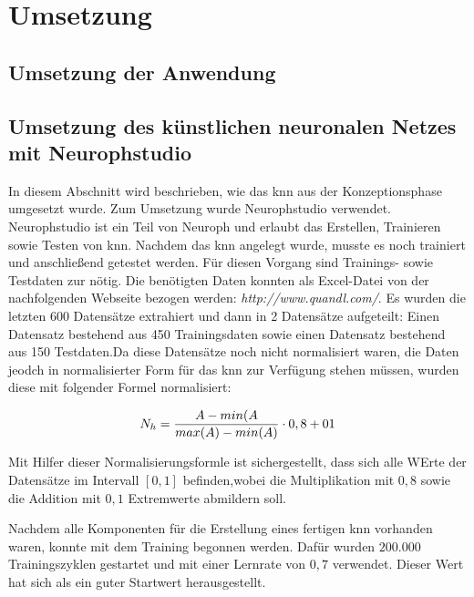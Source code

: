 \chapter{Umsetzung} %

\section{Umsetzung der Anwendung} %

\section{Umsetzung des künstlichen neuronalen Netzes mit Neurophstudio} %
\label{section:Umsetzung des künstlichen neuronalen Netzes mit Neurophstudio} %

In diesem Abschnitt wird beschrieben, wie das \acs{knn} aus der Konzeptionsphase umgesetzt wurde. Zum Umsetzung wurde Neurophstudio verwendet. Neurophstudio ist ein Teil von Neuroph und erlaubt das Erstellen, Trainieren sowie Testen von \acs{knn}.
Nachdem das \acs{knn} angelegt wurde, musste es noch trainiert und anschließend getestet werden. Für diesen Vorgang sind Trainings- sowie Testdaten zur nötig. Die benötigten Daten konnten als Excel-Datei von der nachfolgenden Webseite bezogen werden: 
\textit{http://www.quandl.com/}. Es wurden die letzten 600 Datensätze extrahiert und dann in 2 Datensätze aufgeteilt: Einen Datensatz bestehend aus 450 Trainingsdaten sowie einen Datensatz bestehend aus 150 Testdaten.Da diese Datensätze noch nicht normalisiert waren, die Daten jeodch in normalisierter Form für das \acs{knn} zur Verfügung stehen müssen, wurden diese mit folgender Formel normalisiert:

\begin{equation}\formelentry{Normalisierungsformel}
  N_h = \frac{A-min(A}{max(A)-min(A)}\cdot0,8+01
\end{equation}

Mit Hilfer dieser Normalisierungsformle ist sichergestellt, dass sich alle WErte der Datensätze im Intervall $[0,1]$ befinden,wobei die Multiplikation mit $0,8$ sowie die Addition mit $0,1$ Extremwerte abmildern soll.

Nachdem alle Komponenten für die Erstellung eines fertigen \acs{knn} vorhanden waren, konnte mit dem Training begonnen werden. Dafür wurden $200.000$ Trainingszyklen gestartet und mit einer Lernrate von $0,7$ verwendet. Dieser Wert hat sich als ein guter Startwert herausgestellt.


